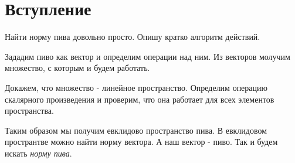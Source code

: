 \section*{Вступление}
Найти норму пива довольно просто. Опишу кратко алгоритм действий.

Зададим пиво как вектор и определим операции над ним.
Из векторов молучим множество, с которым и будем работать.

Докажем, что множество - линейное пространство.
Определим операцию скалярного произведения и проверим,
что она работает для всех элементов пространства.

Таким образом мы получим евклидово пространство пива.
В евклидовом пространтве можно найти норму вектора.
А наш вектор - пиво. Так и будем искать \textit{норму пива}.
